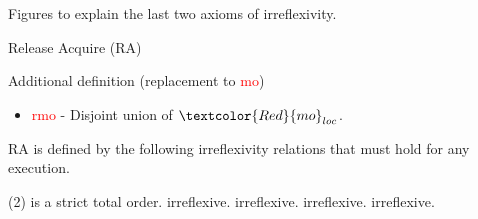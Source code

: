 \documentclass[xcolor={dvipsnames}, notes]{beamer}
\newcommand{\mo}{\textcolor{Red}{mo}}
\newcommand{\hb}{\textcolor{NavyBlue}{hb}}
\newcommand{\fr}{\textcolor{RubineRed}{fr}}
\newcommand{\rmo}{\textcolor{Red}{rmo}}
\begin{document}
    \begin{frame}{Figures to explain the last two axioms of irreflexivity.}
            
        \begin{figure}
        \end{figure}

        \begin{figure}
        \end{figure}

    \end{frame}


    \begin{frame}{Release Acquire (RA)}
        
        Additional definition (replacement to {\mo})
        \begin{itemize}
            \item {\rmo} - Disjoint union of {$\mo_{loc}$}.
        \end{itemize}

        RA is defined by the following irreflexivity relations that must hold for any execution.
        \begin{tasks}(2)
            \task {$\mo_{loc}$} is a strict total order.
            \task {\hb} irreflexive.
            \task {\rmo;\hb} irreflexive.
            \task {\fr;\hb} irreflexive.
            \task {\fr;\rmo} irreflexive.
        \end{tasks}

    \end{frame}
\end{document}
